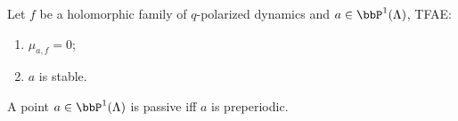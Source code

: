 %
%

\begin{theorem}[label=\labelNFM{thm:temporay}, status=draft, tag=0000000]
	Let $f$ be a holomorphic family of $q$-polarized dynamics and $a \in \bbP^1(\Lambda)$,
	TFAE:
	\begin{enumerate}
		\item $\mu_{a,f} = 0$;
		\item $a$ is stable.
	\end{enumerate}

	A point $a \in \bbP^1(\Lambda)$ is passive iff $a$ is preperiodic.
	\Yang{}
\end{theorem}







